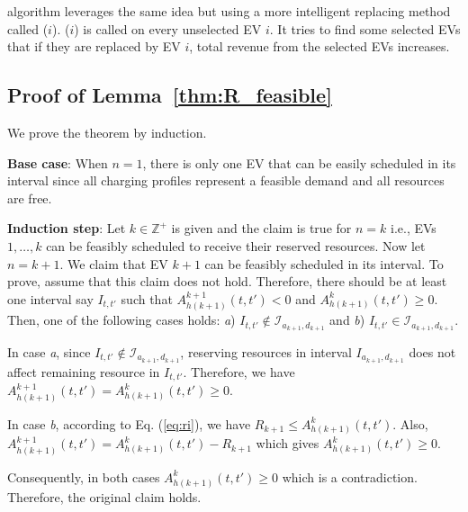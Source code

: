 \ics algorithm leverages the same idea but using a more intelligent replacing method called \rc($i$). \rc($i$) is called on every unselected EV $i$. It tries to find some selected EVs that if they are replaced by EV $i$, total revenue from the selected EVs increases. 
	
	
			
\subsection{Proof of Lemma~\ref{thm:R_feasible}}
			\label{app:2}
			We prove the theorem by induction. 
			
			\textbf{Base case}: When $n=1$, there is only one EV that can be easily scheduled in its interval since all charging profiles represent a feasible demand and all resources are free.
			
			\textbf{Induction step}: Let $k\in\mathbb{Z}^+$ is given and the claim is true for $n=k$ i.e., EVs $1,\dots , k$ can be feasibly scheduled to receive their reserved resources. Now let $n=k+1$. We claim that EV $k+1$ can be feasibly scheduled in its interval. To prove, assume that this claim does not hold. Therefore, there should be at least one interval say $I_{t,t'}$ such that $A^{k+1}_{h(k+1)}(t,t')<0$ and $A^{k}_{h(k+1)}(t,t')\geq 0$. Then, one of the following cases holds: \textit{a})  $I_{t,t'}\notin\mathcal{I}_{a_{k+1},d_{k+1}}$ and \textit{b})  $I_{t,t'}\in\mathcal{I}_{a_{k+1},d_{k+1}}$. 
			
			In case \textit{a}, since $I_{t,t'}\notin\mathcal{I}_{a_{k+1},d_{k+1}}$, reserving resources in interval $I_{a_{k+1},d_{k+1}}$ does not affect remaining resource in $I_{t,t'}$. Therefore, we have $A^{k+1}_{h(k+1)}(t,t')=A^{k}_{h(k+1)}(t,t')\geq 0$. 
			
			In case \textit{b}, according to Eq. (\ref{eq:ri}), we have $R_{k+1}\leq A^{k}_{h(k+1)}(t,t')$. Also, $A^{k+1}_{h(k+1)}(t,t')=A^{k}_{h(k+1)}(t,t')-R_{k+1}$ which gives $A^{k}_{h(k+1)}(t,t')\geq 0$.
			
			Consequently, in both cases $A^{k}_{h(k+1)}(t,t')\geq 0$ which is a contradiction. Therefore, the original claim holds.
			
